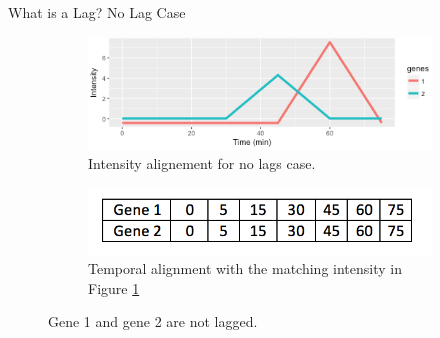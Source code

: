 \documentclass[10pt]{beamer}
\begin{document}
\begin{frame}{What is a Lag? No Lag Case}
\begin{figure}
    \centering
        \begin{subfigure}{.75\textwidth}
          \centering
          \includegraphics[width=1.2\linewidth]{lag1.png}
          \caption{Intensity alignement for no lags case.}
          \label{fig:lag11}
        \end{subfigure}
       \begin{subfigure}{.75\textwidth}
          \centering
          \includegraphics[width=.8\linewidth]{table1.png}
          \caption{Temporal alignment with the matching intensity in Figure \ref{fig:lag11}}
          \label{fig:lag12}
        \end{subfigure}
    \caption{Gene 1 and gene 2 are not lagged.}
    \label{fig:test}
    \end{figure}

\end{frame}
\end{document}
